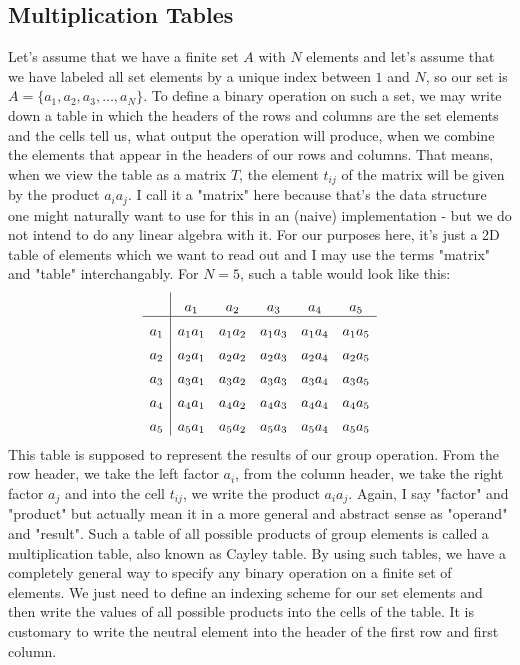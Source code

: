 \subsection{Multiplication Tables}
Let's assume that we have a finite set $A$ with $N$ elements and let's assume that we have labeled all set elements by a unique index between $1$ and $N$, so our set is $A = \{ a_1, a_2, a_3, \ldots, a_N \}$. To define a binary operation on such a set, we may write down a table in which the headers of the rows and columns are the set elements and the cells tell us, what output the operation will produce, when we combine the elements that appear in the headers of our rows and columns. That means, when we view the table as a matrix $T$, the element $t_{ij}$ of the matrix will be given by the product $a_i a_j$. I call it a "matrix" here because that's the data structure one might naturally want to use for this in an (naive) implementation - but we do not intend to do any linear algebra with it. For our purposes here, it's just a 2D table of elements which we want to read out and I may use the terms "matrix" and "table" interchangably. For $N=5$, such a table would look like this:
\[
\setlength{\extrarowheight}{5pt}%
\begin{array}{l|*{5}{c}}
	    & a_1   & a_2  & a_3 & a_4  & a_5 \\
	\hline
	a_1 & a_1 a_1 & a_1 a_2 & a_1 a_3 & a_1 a_4  & a_1 a_5 \\
	a_2 & a_2 a_1 & a_2 a_2 & a_2 a_3 & a_2 a_4  & a_2 a_5 \\
	a_3 & a_3 a_1 & a_3 a_2 & a_3 a_3 & a_3 a_4  & a_3 a_5 \\
	a_4 & a_4 a_1 & a_4 a_2 & a_4 a_3 & a_4 a_4  & a_4 a_5 \\
	a_5 & a_5 a_1 & a_5 a_2 & a_5 a_3 & a_5 a_4  & a_5 a_5 \\
\end{array} 
\]
This table is supposed to represent the results of our group operation. From the row header, we take the left factor $a_i$, from the column header, we take the right factor $a_j$ and into the cell $t_{ij}$, we write the product $a_i a_j$. Again, I say "factor" and "product" but actually mean it in a more general and abstract sense as "operand" and "result". Such a table of all possible products of group elements is called a multiplication table, also known as Cayley table. By using such tables, we have a completely general way to specify any binary operation on a finite set of elements. We just need to define an indexing scheme for our set elements and then write the values of all possible products into the cells of the table. It is customary to write the neutral element into the header of the first row and first column.

